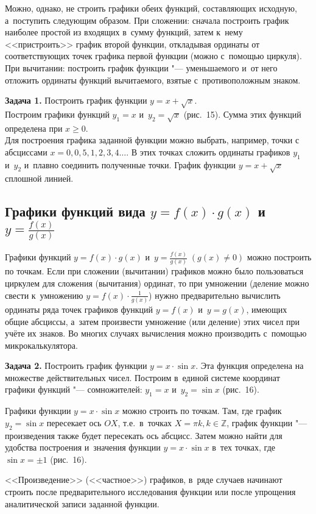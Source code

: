 Можно, однако, не строить графики обеих функций, составляющих исходную,
а~поступить следующим образом.
При сложении: сначала построить график наиболее простой из входящих
в~сумму функций, затем к~нему <<пристроить>> график второй функции,
откладывая ординаты от соответствующих точек графика первой функции
(можно с~помощью циркуля).
При вычитании: построить график функции "--- уменьшаемого и~от него
отложить ординаты функций вычитаемого, взятые с~противоположным знаком.

\textbf{Задача 1.} Построить график функции $y = x + \sqrt{x}$. \\
Построим графики функций $y_{1} = x$ и~$y_{2} = \sqrt{x}$ (рис.\ 15).
Сумма этих функций определена при $x \geqslant 0$. \\
Для построения графика заданной функции можно выбрать, например,
точки с абсциссами $x = 0, 0{,}5, 1, 2, 3, 4 \dots$.
В этих точках сложить ординаты графиков $y_{1}$ и~$y_{2}$ и~плавно
соединить полученные точки. График функции $y = x + \sqrt{x}$
сплошной линией.


\subsection{Графики функций вида $y = f(x) \cdot g(x)$
и~$\displaystyle y = \frac{f(x)}{g(x)}$}
Графики функций  $y = f(x) \cdot g(x)$
и~$\displaystyle y = \frac{f(x)}{g(x)} \; (g(x) \ne 0)$ можно
построить по точкам. Если при сложении (вычитании) графиков
можно было пользоваться циркулем для сложения (вычитания) ординат,
то при умножении (деление можно свести к~умножению 
$\displaystyle y = f(x) \cdot \frac{1}{g(x)}$)
нужно предварительно вычислить ординаты ряда точек графиков
функций $y = f(x)$ и~$y = g(x)$, имеющих общие абсциссы, а~затем
произвести умножение (или деление) этих чисел при учёте их знаков.
Во многих случаях вычисления можно производить с~помощью микрокалькулятора.

\textbf{Задача 2.} Построить график функции $y = x \cdot \sin x$.
Эта функция определена на множестве действительных чисел. Построим
в~единой системе координат графики функций "--- сомножителей:
$y_{1} = x$ и~$y_{2} = \sin x$ (рис.\ 16).

Графики функции $y = x \cdot \sin x$ можно строить по точкам.
Там, где график $y_{2} = \sin x$ пересекает ось $OX$,
т.е.\ в~точках $X = \pi k, k \in \mathbb{Z}$, график функции
"--- произведения также будет пересекать ось абсцисс.
Затем можно найти для удобства построения и~значения функции
$y = x \cdot \sin x$ в~тех точках, где $\sin x = \pm 1$ (рис.\ 16).

<<Произведение>> (<<частное>>) графиков, в~ряде случаев начинают строить
после предварительного исследования функции или после упрощения
аналитической записи заданной функции.


